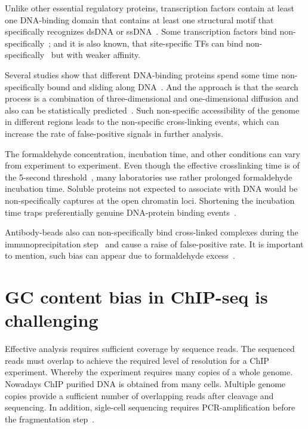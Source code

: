 Unlike other essential regulatory proteins, transcription factors contain at least one DNA-binding domain that contains at least one structural motif that specifically recognizes dsDNA or ssDNA~\cite{mitchell1989transcriptional}.
Some transcription factors bind non-specifically~\cite{struhl2007interpreting};
and it is also known, that site-specific TFs can bind non-specifically~\cite{hammar2012lac,mirny2009protein} but with weaker affinity.

Several studies show that different DNA-binding proteins spend some time non-specifically bound and sliding along DNA~\cite{slutsky2004kinetics,mirny2010nucleosome,cherstvy2008protein,hu2006proteins,sheinman2009effects}.
And the approach is that the search process is a combination of three-dimensional and one-dimensional diffusion and also can be statistically predicted~\cite{sela2011dna}.
Such non-specific accessibility of the genome in different regions leads to the non-specific cross-linking events, which can increase the rate of false-positive signals in further analysis.

The formaldehyde concentration, incubation time, and other conditions can vary from experiment to experiment. 
Even though the effective crosslinking time is of the 5-second threshold~\cite{schmiedeberg2009temporal}, many laboratories use rather prolonged formaldehyde incubation time.
Soluble proteins not expected to associate with DNA would be non-specifically captures at the open chromatin loci. Shortening the incubation time traps preferentially genuine DNA-protein binding events~\cite{baranello2016chip}.

Antibody-beads also can non-specifically bind cross-linked complexes during the immunoprecipitation step~\cite{zhu2014fast} and cause a raise of false-positive rate.
It is important to mention, such bias can appear due to formaldehyde excess~\cite{hanson2018using}.



\section{GC content bias in ChIP-seq is challenging}
Effective analysis requires sufficient coverage by sequence reads. 
The sequenced reads must overlap to achieve the required level of resolution for a ChIP experiment.
Whereby the experiment requires many copies of a whole genome.
Nowadays ChIP purified DNA is obtained from many cells.
Multiple genome copies provide a sufficient number of overlapping reads after cleavage and sequencing.
In addition, sigle-cell sequencing requires PCR-amplification before the fragmentation step~\cite{clark2016single}.

